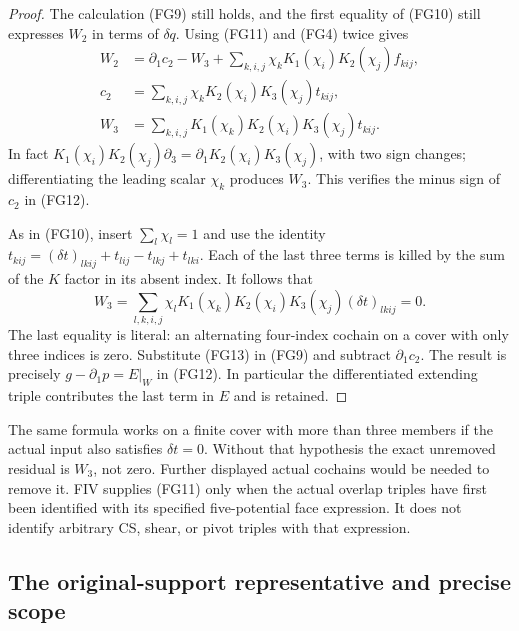 \begin{proof}
The calculation (FG9) still holds, and the first equality of
(FG10) still expresses $W_2$ in terms of $\delta q$.
Using (FG11) and (FG4) twice gives
\[
\begin{split}
 W_2&=\partial_1 c_2-W_3+
           \sum_{k,i,j}\chi_kK_1(\chi_i)K_2(\chi_j)f_{kij},\\
 c_2&=\sum_{k,i,j}\chi_kK_2(\chi_i)K_3(\chi_j)t_{kij},\\
 W_3&=\sum_{k,i,j}K_1(\chi_k)K_2(\chi_i)K_3(\chi_j)t_{kij}.
\end{split}                                                       \tag{FG13}
\]
In fact
$K_1(\chi_i)K_2(\chi_j)\partial_3
 =\partial_1K_2(\chi_i)K_3(\chi_j)$, with two sign changes;
differentiating the leading scalar $\chi_k$ produces $W_3$.
This verifies the minus sign of $c_2$ in (FG12).

As in (FG10), insert $\sum_l\chi_l=1$ and use the identity
$t_{kij}=(\delta t)_{lkij}+t_{lij}-t_{lkj}+t_{lki}$.
Each of the last three terms is killed by the sum of the $K$ factor
in its absent index.  It follows that
\[
 W_3=\sum_{l,k,i,j}\chi_lK_1(\chi_k)K_2(\chi_i)K_3(\chi_j)
                                                     (\delta t)_{lkij}=0.
                                                                  \tag{FG14}
\]
The last equality is literal: an alternating four-index cochain
on a cover with only three indices is zero.  Substitute (FG13)
in (FG9) and subtract $\partial_1c_2$.  The result is precisely
$g-\partial_1p=E|_W$ in (FG12).  In particular the differentiated
extending triple contributes the last term in $E$ and is retained.
\end{proof}

The same formula works on a finite cover with more than three
members if the actual input also satisfies $\delta t=0$.  Without
that hypothesis the exact unremoved residual is $W_3$, not zero.
Further displayed actual cochains would be needed to remove it.
FIV supplies (FG11) only when the actual overlap triples have first
been identified with its specified five-potential face expression.
It does not identify arbitrary CS, shear, or pivot triples with that
expression.

\subsection{The original-support representative and precise scope}

